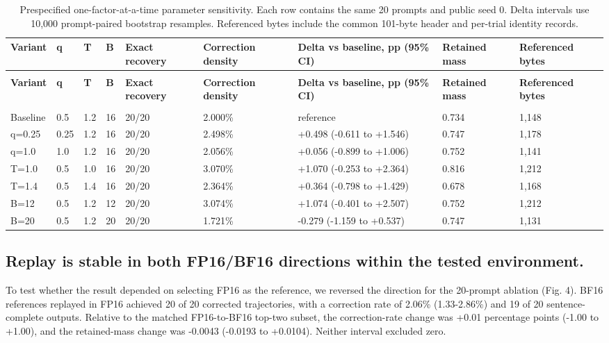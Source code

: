 \documentclass{nature}
\begin{document}
\clearpage
\begingroup
\scriptsize
\setlength{\tabcolsep}{2.5pt}
\renewcommand{\arraystretch}{1.22}
\begin{xltabular}{\textwidth}{@{}>{\raggedright\arraybackslash}X *{8}{Y}@{}}
\caption{Prespecified one-factor-at-a-time parameter sensitivity. Each row contains the same 20 prompts and public seed 0. Delta intervals use 10,000 prompt-paired bootstrap resamples. Referenced bytes include the common 101-byte header and per-trial identity records.}\label{tab:3} \\
\toprule
\textbf{Variant} & \textbf{q} & \textbf{T} & \textbf{B} & \textbf{Exact recovery} & \textbf{Correction density} & \textbf{Delta vs baseline, pp (95\% CI)} & \textbf{Retained mass} & \textbf{Referenced bytes} \\
\midrule
\endfirsthead
{} \\
\toprule
\textbf{Variant} & \textbf{q} & \textbf{T} & \textbf{B} & \textbf{Exact recovery} & \textbf{Correction density} & \textbf{Delta vs baseline, pp (95\% CI)} & \textbf{Retained mass} & \textbf{Referenced bytes} \\
\midrule
\endhead
\midrule
{} \\
\endfoot
\bottomrule
\endlastfoot
Baseline & 0.5 & 1.2 & 16 & 20/20 & 2.000\% & reference & 0.734 & 1,148 \\
q=0.25 & 0.25 & 1.2 & 16 & 20/20 & 2.498\% & +0.498 (-0.611 to +1.546) & 0.747 & 1,178 \\
q=1.0 & 1.0 & 1.2 & 16 & 20/20 & 2.056\% & +0.056 (-0.899 to +1.006) & 0.752 & 1,141 \\
T=1.0 & 0.5 & 1.0 & 16 & 20/20 & 3.070\% & +1.070 (-0.253 to +2.364) & 0.816 & 1,212 \\
T=1.4 & 0.5 & 1.4 & 16 & 20/20 & 2.364\% & +0.364 (-0.798 to +1.429) & 0.678 & 1,168 \\
B=12 & 0.5 & 1.2 & 12 & 20/20 & 3.074\% & +1.074 (-0.401 to +2.507) & 0.752 & 1,212 \\
B=20 & 0.5 & 1.2 & 20 & 20/20 & 1.721\% & -0.279 (-1.159 to +0.537) & 0.747 & 1,131 \\
\end{xltabular}
\endgroup
\clearpage
\subsection{Replay is stable in both FP16/BF16 directions within the tested environment.}
To test whether the result depended on selecting FP16 as the reference, we reversed the direction for the 20-prompt ablation (Fig. 4). BF16 references replayed in FP16 achieved 20 of 20 corrected trajectories, with a correction rate of 2.06\% (1.33-2.86\%) and 19 of 20 sentence-complete outputs. Relative to the matched FP16-to-BF16 top-two subset, the correction-rate change was +0.01 percentage points (-1.00 to +1.00), and the retained-mass change was -0.0043 (-0.0193 to +0.0104). Neither interval excluded zero.
\end{document}
